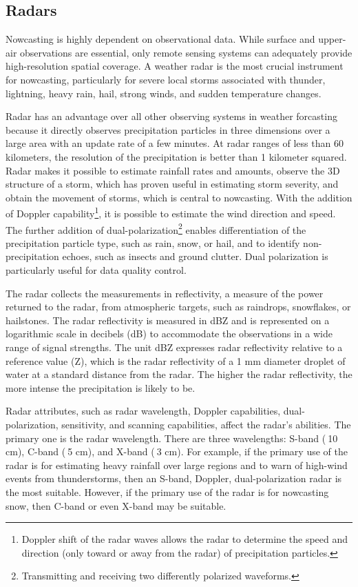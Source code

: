 \subsection{Radars}
\label{subsec:radars}

Nowcasting is highly dependent on observational data. While surface and upper-air observations are essential, only remote sensing systems can adequately provide high-resolution spatial coverage. A weather radar is the most crucial instrument for nowcasting, particularly for severe local storms associated with thunder, lightning, heavy rain, hail, strong winds, and sudden temperature changes.

Radar has an advantage over all other observing systems in weather forcasting because it directly observes precipitation particles in three dimensions over a large area with an update rate of a few minutes. At radar ranges of less than 60 kilometers, the resolution of the precipitation is better than 1 kilometer squared. Radar makes it possible to estimate rainfall rates and amounts, observe the 3D structure of a storm, which has proven useful in estimating storm severity, and obtain the movement of storms, which is central to nowcasting. With the addition of Doppler capability\footnote{Doppler shift of the radar waves allows the radar to determine the speed and direction (only toward or away from the radar) of precipitation particles.}, it is possible to estimate the wind direction and speed. The further addition of dual-polarization\footnote{Transmitting and receiving two differently polarized waveforms.} enables differentiation of the precipitation particle type, such as rain, snow, or hail, and to identify non-precipitation echoes, such as insects and ground clutter. Dual polarization is particularly useful for data quality control. \cite{nowcastingguidlines}

The radar collects the measurements in reflectivity, a measure of the power returned to the radar, from atmospheric targets, such as raindrops, snow\-flakes, or hailstones. The radar reflectivity is measured in dBZ and is represented on a logarithmic scale in decibels (dB) to accommodate the observations in a wide range of signal strengths. The unit dBZ expresses radar reflectivity relative to a reference value (Z), which is the radar reflectivity of a 1 mm diameter droplet of water at a standard distance from the radar. The higher the radar reflectivity, the more intense the precipitation is likely to be.

Radar attributes, such as radar wavelength, Doppler capabilities, dual-polarization, sensitivity, and scanning capabilities, affect the radar's abilities. The primary one is the radar wavelength. There are three wavelengths: S-band ($~$10 cm), C-band ($~$5 cm), and X-band ($~$3 cm). For example, if the primary use of the radar is for estimating heavy rainfall over large regions and to warn of high-wind events from thunderstorms, then an S-band, Doppler, dual-polarization radar is the most suitable. However, if the primary use of the radar is for nowcasting snow, then C-band or even X-band may be suitable. \cite{nowcastingguidlines}

